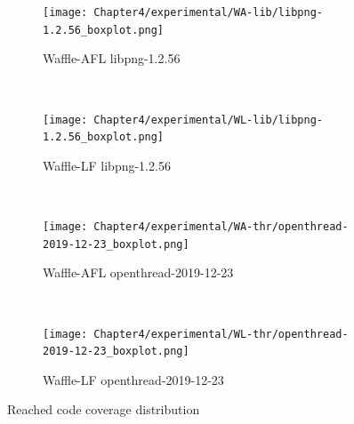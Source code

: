 \begin{figure}[!t]
    \begin{adjustbox}{center,max width=1.3\textwidth}
        \begin{subfigure}[t]{0.5\textwidth}
            \centering
            \texttt{[image: Chapter4/experimental/WA-lib/libpng-1.2.56\_boxplot.png]}
            \vspace*{-5mm}
            \caption{Waffle-AFL libpng-1.2.56}
            \label{box:wal}
            \vspace*{5mm}
        \end{subfigure}
        ~
        \begin{subfigure}[t]{0.5\textwidth}
            \centering
            \texttt{[image: Chapter4/experimental/WL-lib/libpng-1.2.56\_boxplot.png]}
            \vspace*{-5mm}
            \caption{Waffle-LF libpng-1.2.56}
            \label{box:wll}
            \vspace*{5mm}
        \end{subfigure}
    \end{adjustbox}
    ~
    \begin{adjustbox}{center,max width=1.3\textwidth}
        \begin{subfigure}[t]{0.5\textwidth}
            \centering
            \texttt{[image: Chapter4/experimental/WA-thr/openthread-2019-12-23\_boxplot.png]}
            \vspace*{-5mm}
            \caption{Waffle-AFL openthread-2019-12-23}
            \label{box:wao}
            \vspace*{5mm}
        \end{subfigure}
        ~
        \begin{subfigure}[t]{0.5\textwidth}
            \centering
            \texttt{[image: Chapter4/experimental/WL-thr/openthread-2019-12-23\_boxplot.png]}
            \vspace*{-5mm}
            \caption{Waffle-LF openthread-2019-12-23}
            \label{box:wlo}
            \vspace*{5mm}
        \end{subfigure}
    \end{adjustbox}
    \caption{Reached code coverage distribution}
\end{figure}

